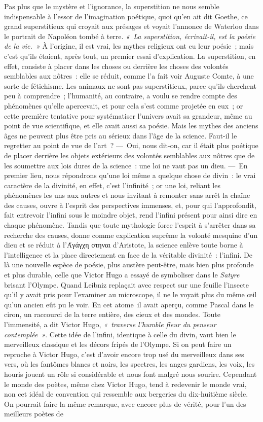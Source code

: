 \documentclass[french,twoside]{book} %
\begin{document}
Pas plus que le mystère et l’ignorance, la superstition ne nous semble indispensable à l’essor de l’imagination poétique, quoi qu’en ait dit Goethe, ce grand superstitieux qui croyait aux présages et voyait l’annonce de Waterloo dans le portrait de Napoléon tombé à terre. \emph{« La superstition, écrivait-il, est la poésie de la vie. »} À l’origine, il est vrai, les mythes religieux ont eu leur poésie ; mais c’est qu’ils étaient, après tout, un premier essai d’explication. La superstition, en effet, consiste à placer dans les choses ou derrière les choses des volontés semblables aux nôtres : elle se réduit, comme l’a fait voir Auguste Comte, à une sorte de fétichisme. Les animaux ne sont pas superstitieux, parce qu’ils cherchent peu à comprendre ; l’humanité, au contraire, a voulu se rendre compte des phénomènes qu’elle apercevait, et pour cela s’est comme projetée en eux ; or cette première tentative pour systématiser l’univers avait sa grandeur, même au point de vue scientifique, et elle avait aussi sa poésie. Mais les mythes des anciens âges ne peuvent plus être pris au sérieux dans l’âge de la science. Faut-il le regretter au point de vue de l’art ? — Oui, nous dit-on, car il était plus poétique de placer derrière les objets  extérieurs des volontés semblables aux nôtres que de les soumettre aux lois dures de la science : une loi ne vaut pas un dieu. — En premier lieu, nous répondrons qu’une loi même a quelque chose de divin : le vrai caractère de la divinité, en effet, c’est l’infinité ; or une loi, reliant les phénomènes les uns aux autres et nous invitant à remonter sans arrêt la chaîne des causes, ouvre à l’esprit des perspectives immenses, et, pour qui l’approfondit, fait entrevoir l’infini sous le moindre objet, rend l’infini présent pour ainsi dire en chaque phénomène. Tandis que toute mythologie force l’esprit à s’arrêter dans sa recherche des causes, donne comme explication suprême la volonté mesquine d’un dieu et se réduit à l’Άγάγχη στηναι d’Aristote, la science enlève toute borne à l’intelligence et la place directement en face de la véritable divinité : l’infini. De là une nouvelle espèce de poésie, plus austère peut-être, mais bien plus profonde et plus durable, celle que Victor Hugo a essayé de symboliser dans le \emph{Satyre} brisant l’Olympe. Quand Leibniz replaçait avec respect sur une feuille l’insecte qu’il y avait pris pour l’examiner au microscope, il ne le voyait plus du même œil qu’un ancien eût pu le voir. En cet atome il avait aperçu, comme Pascal dans le ciron, un raccourci de la terre entière, des cieux et des mondes. Toute l’immensité, a dit Victor Hugo, \emph{« traverse l’humble fleur du penseur contemplée »}. Cette idée de l’infini, identique à celle du divin, vaut bien le merveilleux classique et les décors fripés de l’Olympe. Si on peut faire un reproche à Victor Hugo, c’est d’avoir encore trop usé du merveilleux dans ses vers, où les fantômes blancs et noirs, les  spectres, les anges gardiens, les voix, les houris jouent un rôle si considérable et nous font malgré nous sourire. Cependant le monde des poètes, même chez Victor Hugo, tend à redevenir le monde vrai, non cet idéal de convention qui ressemble aux bergeries du dix-huitième siècle. On pourrait faire la même remarque, avec encore plus de vérité, pour l’un des meilleurs poètes de 
\end{document}
